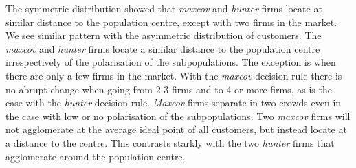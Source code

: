 \documentclass[preprint, 12pt]{elsarticle}
\begin{document}
The symmetric distribution showed that \emph{maxcov} and \emph{hunter} firms locate at similar distance to the population centre, except with two firms in the market. We see similar pattern with the asymmetric distribution of customers. The \emph{maxcov} and \emph{hunter} firms locate a similar distance to the population centre irrespectively of the polarisation of the subpopulations. The exception is when there are only a few firms in the market. With the \emph{maxcov} decision rule there is no abrupt change when going from 2-3 firms and to 4 or more firms, as is the case with the \emph{hunter} decision rule. \emph{Maxcov}-firms separate in two crowds even in the case with low or no polarisation of the subpopulations. Two \emph{maxcov} firms will not agglomerate at the average ideal point of all customers, but instead locate at a distance to the centre. This contrasts starkly with the two \emph{hunter} firms that agglomerate around the population centre.
\end{document}
